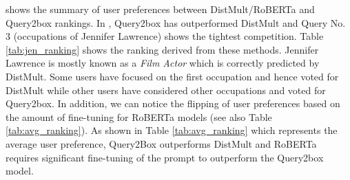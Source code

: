  shows the summary of user preferences between DistMult/RoBERTa and Query2box rankings. In , Query2box has outperformed DistMult and Query No. 3 (occupations of Jennifer Lawrence) shows the tightest competition. Table \ref{tab:jen_ranking} shows the ranking derived from these methods. Jennifer Lawrence is mostly known as a \textit{Film Actor} which is correctly predicted by DistMult. Some users have focused on the first occupation and hence voted for DistMult while other users have considered other occupations and voted for Query2box. In addition, we can notice the flipping of user preferences based on the amount of fine-tuning for RoBERTa models (see also Table \ref{tab:avg_ranking}). As shown in Table \ref{tab:avg_ranking} which represents the average user preference, Query2Box outperforms DistMult and RoBERTa requires significant fine-tuning of the prompt to outperform the Query2box model.

